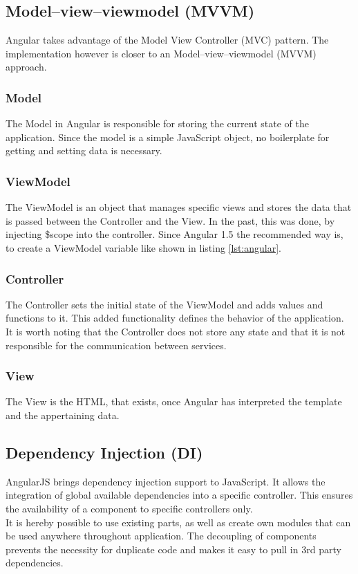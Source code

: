\subsection{Model–view–viewmodel (MVVM)}
Angular takes advantage of the Model View Controller (MVC) pattern. The implementation however is closer to an Model–view–viewmodel (MVVM) approach. 

\subsubsection{Model}
The Model in Angular is responsible for storing the current state of the application. Since the model is a simple JavaScript object, no boilerplate for getting and setting data is necessary.

\subsubsection{ViewModel}
The ViewModel is an object that manages specific views and stores the data that is passed between the Controller and the View. In the past, this was done, by injecting \$scope into the controller. Since Angular 1.5 the recommended way is, to create a ViewModel variable like shown in listing \ref{lst:angular}.

\subsubsection{Controller}
The Controller sets the initial state of the ViewModel and adds values and functions to it. This added functionality defines the behavior of the application. It is worth noting that the Controller does not store any state and that it is not responsible for the communication between services.

\subsubsection{View}
The View is the HTML, that exists, once Angular has interpreted the template and the appertaining data.

\subsection{Dependency Injection (DI)}
AngularJS brings dependency injection support to JavaScript. It allows the integration of global available dependencies into a specific controller. This ensures the availability of a component to specific controllers only.\\
It is hereby possible to use existing parts, as well as create own modules that can be used anywhere throughout application. The decoupling of components prevents the necessity for duplicate code and makes it easy to pull in 3rd party dependencies.  

